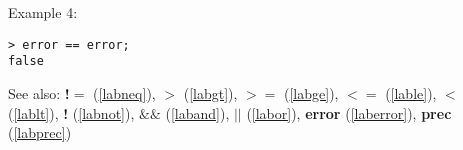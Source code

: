 \noindent Example 4: 
\begin{center}\begin{minipage}{15cm}\begin{Verbatim}[frame=single]
> error == error;
false
\end{Verbatim}
\end{minipage}\end{center}
See also: \textbf{!$=$} (\ref{labneq}), \textbf{$>$} (\ref{labgt}), \textbf{$>=$} (\ref{labge}), \textbf{$<=$} (\ref{lable}), \textbf{$<$} (\ref{lablt}), \textbf{!} (\ref{labnot}), \textbf{$\&\&$} (\ref{laband}), \textbf{$||$} (\ref{labor}), \textbf{error} (\ref{laberror}), \textbf{prec} (\ref{labprec})
